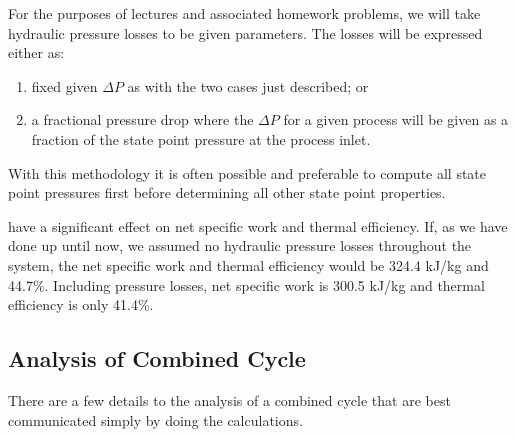 For the purposes of lectures and associated homework problems, we will take hydraulic pressure losses to be given parameters.  The losses will be expressed either as:
\begin{enumerate}
\item fixed given $\Delta P$ as with the two cases just described; or
\item a fractional pressure drop where the $\Delta P$ for a given process will be given as a fraction of the state point pressure at the process inlet. 
\end{enumerate}
With this methodology it is often possible and preferable to compute all state point pressures first before determining all other state point properties.

 have a significant effect on net specific work and thermal efficiency.  If, as we have done up until now, we assumed no hydraulic pressure losses throughout the system, the net specific work and thermal efficiency would be 324.4 kJ/kg and 44.7\%.  Including pressure losses, net specific work is 300.5 kJ/kg and thermal efficiency is only 41.4\%.

\subsection{Analysis of Combined Cycle}
There are a few details to the analysis of a combined cycle that are best communicated simply by doing the calculations.  


